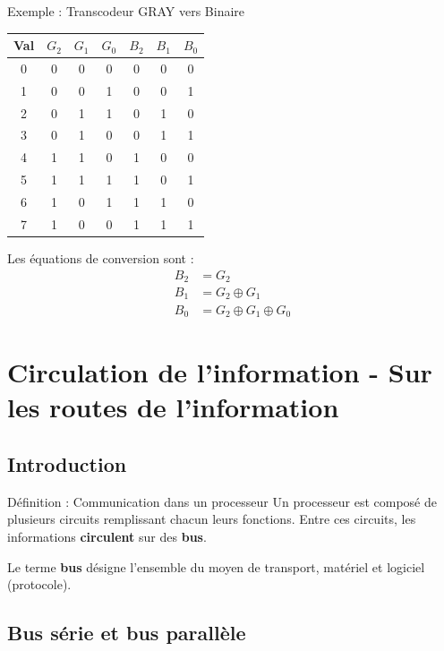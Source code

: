 \documentclass[a4paper,12pt]{article}
\begin{document}
\begin{examplebox}{Exemple : Transcodeur GRAY vers Binaire}
\begin{center}
\begin{tabular}{|c|ccc|ccc|}
\hline
\textbf{Val} & $G_2$ & $G_1$ & $G_0$ & $B_2$ & $B_1$ & $B_0$ \\
\hline
0 & 0 & 0 & 0 & 0 & 0 & 0 \\
1 & 0 & 0 & 1 & 0 & 0 & 1 \\
2 & 0 & 1 & 1 & 0 & 1 & 0 \\
3 & 0 & 1 & 0 & 0 & 1 & 1 \\
4 & 1 & 1 & 0 & 1 & 0 & 0 \\
5 & 1 & 1 & 1 & 1 & 0 & 1 \\
6 & 1 & 0 & 1 & 1 & 1 & 0 \\
7 & 1 & 0 & 0 & 1 & 1 & 1 \\
\hline
\end{tabular}
\end{center}

Les équations de conversion sont :
\begin{align*}
B_2 &= G_2 \\
B_1 &= G_2 \oplus G_1 \\
B_0 &= G_2 \oplus G_1 \oplus G_0
\end{align*}
\end{examplebox}

\newpage
\section{Circulation de l'information - Sur les routes de l'information}

\subsection{Introduction}

\begin{defbox}{Définition : Communication dans un processeur}
Un processeur est composé de plusieurs circuits remplissant chacun leurs fonctions. Entre ces circuits, les informations \textbf{circulent} sur des \textbf{bus}. 

Le terme \textbf{bus} désigne l'ensemble du moyen de transport, matériel et logiciel (protocole).
\end{defbox}

\subsection{Bus série et bus parallèle}
\end{document}
